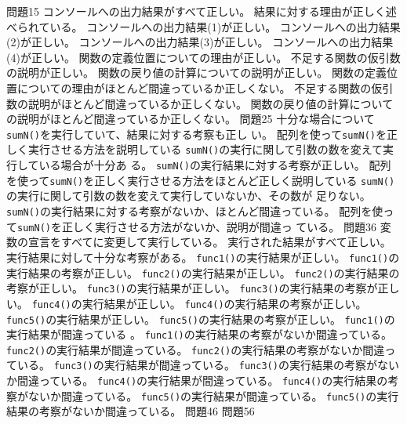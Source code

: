 {{問題1}{5}{
  {コンソールへの出力結果がすべて正しい。}
	{結果に対する理由が正しく述べられている。}
	}
	{
  {コンソールへの出力結果(1)が正しい。}
  {コンソールへの出力結果(2)が正しい。}
  {コンソールへの出力結果(3)が正しい。}
  {コンソールへの出力結果(4)が正しい。}
	{関数の定義位置についての理由が正しい。}
	{不足する関数の仮引数の説明が正しい。}
	{関数の戻り値の計算についての説明が正しい。}
	}
	{
	{関数の定義位置についての理由がほとんど間違っているか正しくない。}
	{不足する関数の仮引数の説明がほとんど間違っているか正しくない。}
	{関数の戻り値の計算についての説明がほとんど間違っているか正しくない。}
	}
{問題2}{5}{
  {十分な場合について\texttt{sumN()}を実行していて、結果に対する考察も正し
	い。}
	{配列を使って\texttt{sumN()}を正しく実行させる方法を説明している}
	}
	{
  {\texttt{sumN()}の実行に関して引数の数を変えて実行している場合が十分あ
	る。}
  {\texttt{sumN()}の実行結果に対する考察が正しい。}
	{配列を使って\texttt{sumN()}を正しく実行させる方法をほとんど正しく説明している}
	}
	{
  {\texttt{sumN()}の実行に関して引数の数を変えて実行していないか、その数が
	足りない。}
  {\texttt{sumN()}の実行結果に対する考察がないか、ほとんど間違っている。}
	{配列を使って\texttt{sumN()}を正しく実行させる方法がないか、説明が間違っ
  ている。}
	}
{問題3}{6}{
  {変数の宣言をすべてに変更して実行している。}
  {実行された結果がすべて正しい。}
  {実行結果に対して十分な考察がある。}
	}
	{
	{\texttt{func1()}の実行結果が正しい。}
	{\texttt{func1()}の実行結果の考察が正しい。}
	{\texttt{func2()}の実行結果が正しい。}
	{\texttt{func2()}の実行結果の考察が正しい。}
	{\texttt{func3()}の実行結果が正しい。}
	{\texttt{func3()}の実行結果の考察が正しい。}
	{\texttt{func4()}の実行結果が正しい。}
	{\texttt{func4()}の実行結果の考察が正しい。}
	{\texttt{func5()}の実行結果が正しい。}
	{\texttt{func5()}の実行結果の考察が正しい。}
	}
	{
	{\texttt{func1()}の実行結果が間違っている%
  。}
	{\texttt{func1()}の実行結果の考察がないか間違っている。}
	{\texttt{func2()}の実行結果が間違っている。}
	{\texttt{func2()}の実行結果の考察がないか間違っている。}
	{\texttt{func3()}の実行結果が間違っている。}
	{\texttt{func3()}の実行結果の考察がないか間違っている。}
	{\texttt{func4()}の実行結果が間違っている。}
	{\texttt{func4()}の実行結果の考察がないか間違っている。}
	{\texttt{func5()}の実行結果が間違っている。}
	{\texttt{func5()}の実行結果の考察がないか間違っている。}
	}
{問題4}{6}{
  {}
	}
	{
	{}
	}
	{
	{}
	}
{問題5}{6}{
  {}
	}
	{
	{}
	}
	{
	{}
	}
}